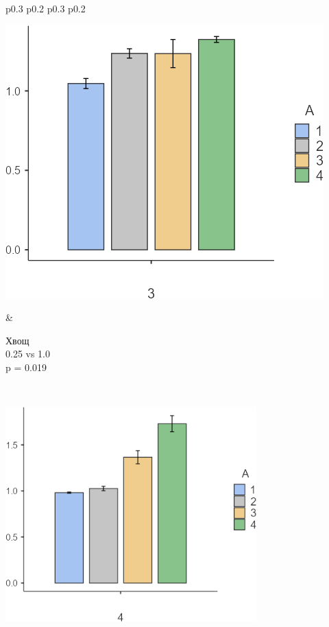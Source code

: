 \begin{tabular}{p{0.3\textwidth} p{0.2\textwidth} p{0.3\textwidth} p{0.2\textwidth}}
\begin{minipage}[t]{\linewidth}
    \includegraphics[width=\linewidth]{media/chem/image10}
\end{minipage} & 
\begin{minipage}[t]{\linewidth}
    \vspace{0pt} %
    \small{
    Хвощ \\
    0.25 vs 1.0 \\
    p = 0.019}
\end{minipage} \\
\begin{minipage}[t]{\linewidth}
    \vspace{0pt} %
    \includegraphics[width=\linewidth]{media/chem/image11}

\end{minipage}
\end{tabular}
